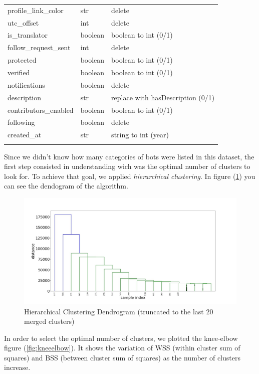 \begin{center}
\begin{tabular}{lll}
		profile\_link\_color&str&delete\\
		utc\_offset&int&delete\\
		is\_translator&boolean&boolean to int (0/1)\\
		follow\_request\_sent&int&delete\\
		protected&boolean&boolean to int (0/1)\\
		verified&boolean&boolean to int (0/1)\\
		notifications&boolean&delete\\
		description&str&replace with hasDescription (0/1)\\
		contributors\_enabled&boolean&boolean to int (0/1)\\
		following&boolean&delete\\
		created\_at&str&string to int (year)\\\hline\\
	\end{tabular}
\end{center}

\normalsize
\clearpage

Since we didn't know how many categories of bots were listed in this dataset, the first step consisted in understanding wich was the optimal number of clusters to look for. To achieve that goal, we applied \textit{hierarchical clustering}. In figure (\ref{fig:dendogram}) you can see the dendogram of the algorithm.


\begin{figure}
	\includegraphics[width=\linewidth]{chapter3/figure/dendogram.jpg}
	\caption{Hierarchical Clustering Dendrogram (truncated to the last 20 merged clusters)}
	\label{fig:dendogram}
\end{figure}

In order to select the optimal number of clusters, we plotted the knee-elbow figure (\ref{fig:kneeelbow}). It shows the variation of WSS (within cluster sum of squares) and BSS (between cluster sum of squares) as the number of clusters increase.\\

